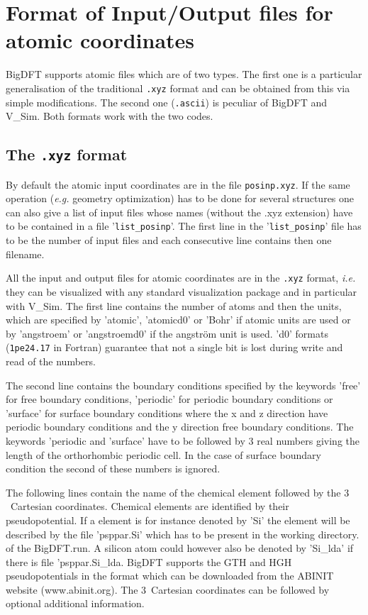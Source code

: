 \documentclass[a4paper,11pt]{report}
\begin{document}
\section{Format of Input/Output files for atomic coordinates} 
BigDFT supports atomic files which are of two types.
The first one is a particular generalisation of the traditional \texttt{.xyz} format and can be obtained from this via simple modifications.
The second one (\texttt{.ascii}) is peculiar of BigDFT and V\_Sim. Both formats work with the two codes.
\subsection{The \texttt{.xyz} format}
By default the atomic input coordinates are in the file \texttt{posinp.xyz}.
If the same operation (\textit{e.g.} geometry optimization) 
has to be done for several structures one can also give a list of input files whose names (without the .xyz extension) 
have to be contained in a file '\texttt{list\_posinp}'. The first line in the '\texttt{list\_posinp}' file has to be the number of input 
files and each consecutive line contains then one filename.

All the input and output files for atomic coordinates are in the \texttt{.xyz} format, \textit{i.e.} they can be visualized with any 
standard visualization package and in particular with V\_Sim. The first line contains the number of atoms 
and then the units, which are specified by 'atomic', 'atomicd0' or 'Bohr' if atomic units are used or by 
'angstroem' or 'angstroemd0' if the angstr\"om unit is used. 'd0' formats (\texttt{1pe24.17} in Fortran) guarantee that not a single bit is 
lost during write and read of the numbers.

The second line contains the boundary conditions specified by the keywords 'free' for free boundary 
conditions, 'periodic' for periodic boundary conditions or 'surface' for surface boundary conditions
where the x and z direction have periodic boundary conditions and the y direction free boundary conditions. 
The keywords 'periodic and 'surface' have to be followed by 3 real numbers giving the length of the 
orthorhombic periodic cell. In the case of surface boundary condition the second of these numbers is ignored.

The following lines contain the name of the chemical element followed by the $3$~Cartesian coordinates. 
Chemical elements are identified by their pseudopotential. If a element is for instance denoted by 
'Si' the element will be described by the file 'psppar.Si' which has to be present in the working directory.
of the BigDFT.run. A silicon atom could however also be denoted by 'Si\_lda' if there is file 'psppar.Si\_lda.
BigDFT supports the GTH and HGH pseudopotentials in the format which can be downloaded from the ABINIT website
(www.abinit.org). The $3$~Cartesian coordinates can be followed by optional additional information.
\end{document}
